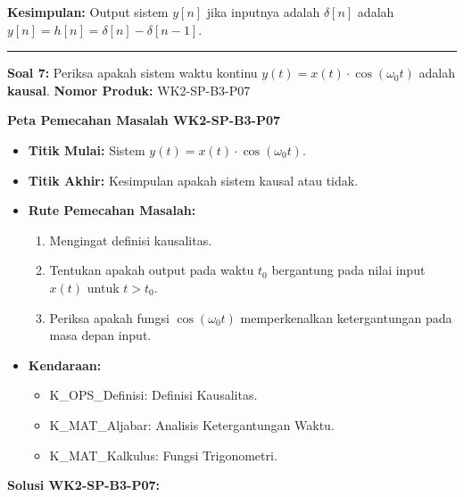 \documentclass[
  letterpaper,
  DIV=11,
  numbers=noendperiod]{scrreprt}
\providecommand{\tightlist}{%
  \setlength{\itemsep}{0pt}\setlength{\parskip}{0pt}}
\begin{document}
\textbf{Kesimpulan:} Output sistem \(y[n]\) jika inputnya adalah
\(\delta[n]\) adalah \(y[n] = h[n] = \delta[n] - \delta[n-1]\).

\begin{center}\rule{0.5\linewidth}{0.5pt}\end{center}

\textbf{Soal 7:} Periksa apakah sistem waktu kontinu
\(y(t) = x(t) \cdot \cos(\omega_0 t)\) adalah \textbf{kausal}.
\textbf{Nomor Produk:} WK2-SP-B3-P07

\textbf{Peta Pemecahan Masalah WK2-SP-B3-P07}

\begin{itemize}
\tightlist
\item
  \textbf{Titik Mulai:} Sistem \(y(t) = x(t) \cdot \cos(\omega_0 t)\).
\item
  \textbf{Titik Akhir:} Kesimpulan apakah sistem kausal atau tidak.
\item
  \textbf{Rute Pemecahan Masalah:}

  \begin{enumerate}
  \def\labelenumi{\arabic{enumi}.}
  \tightlist
  \item
    Mengingat definisi kausalitas.
  \item
    Tentukan apakah output pada waktu \(t_0\) bergantung pada nilai
    input \(x(t)\) untuk \(t > t_0\).
  \item
    Periksa apakah fungsi \(\cos(\omega_0 t)\) memperkenalkan
    ketergantungan pada masa depan input.
  \end{enumerate}
\item
  \textbf{Kendaraan:}

  \begin{itemize}
  \tightlist
  \item
    K\_OPS\_Definisi: Definisi Kausalitas.
  \item
    K\_MAT\_Aljabar: Analisis Ketergantungan Waktu.
  \item
    K\_MAT\_Kalkulus: Fungsi Trigonometri.
  \end{itemize}
\end{itemize}

\textbf{Solusi WK2-SP-B3-P07:}
\end{document}
